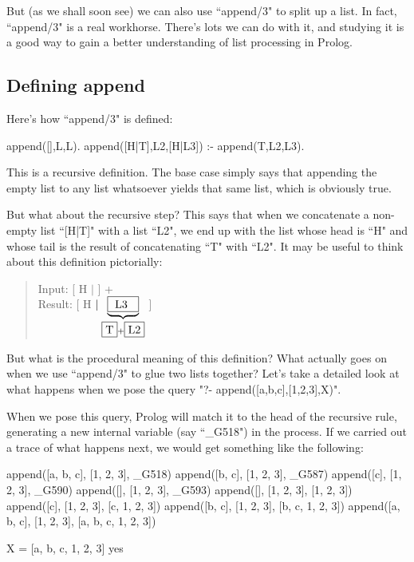But (as we shall soon see) we can also use ``append/3" to split up a
list.  In fact, ``append/3" is a real workhorse.  There's lots we
can do with it, and studying it is a good way to gain a better
understanding of list processing in Prolog.

\subsection*{Defining append}\label{SUBSEC.L6.DEFINING.APPEND}



Here's how ``append/3" is defined:
\begin{LPNcodedisplay}
append([],L,L).
append([H|T],L2,[H|L3]) :- append(T,L2,L3).
\end{LPNcodedisplay}

This is a recursive definition. The base case simply says that
appending the empty list to any list whatsoever yields that same list,
which is obviously true.

But what about the recursive step?  This says that when we concatenate
a non-empty list ``[H|T]" with a list ``L2", we end up with
the list whose head is ``H" and whose tail is the result of
concatenating ``T" with ``L2". It may be useful to think about
this definition pictorially:


\begin{quote}
Input:  [ H $\mid$  ] +  \\[5mm]
Result: [ H $\mid \underbrace{\fbox{\ L3 \ }}_{\fbox{T}+\fbox{L2}}$ ]
\end{quote}








But what is the procedural meaning of this definition?  What actually
goes on when we use ``append/3" to glue two lists together?
Let's take a detailed look at what happens when we pose the query
"?- append([a,b,c],[1,2,3],X)".

When we pose this query, Prolog will match it to the
head of the recursive rule, generating a new internal variable
(say ``\_G518") in the process. If we carried out a trace of what
happens next, we would get something like the following:

\begin{LPNcodedisplay}
append([a, b, c], [1, 2, 3], _G518)
append([b, c], [1, 2, 3], _G587)
append([c], [1, 2, 3], _G590)
append([], [1, 2, 3], _G593)
append([], [1, 2, 3], [1, 2, 3])
append([c], [1, 2, 3], [c, 1, 2, 3])
append([b, c], [1, 2, 3], [b, c, 1, 2, 3])
append([a, b, c], [1, 2, 3], [a, b, c, 1, 2, 3])

X = [a, b, c, 1, 2, 3]
yes
\end{LPNcodedisplay}


